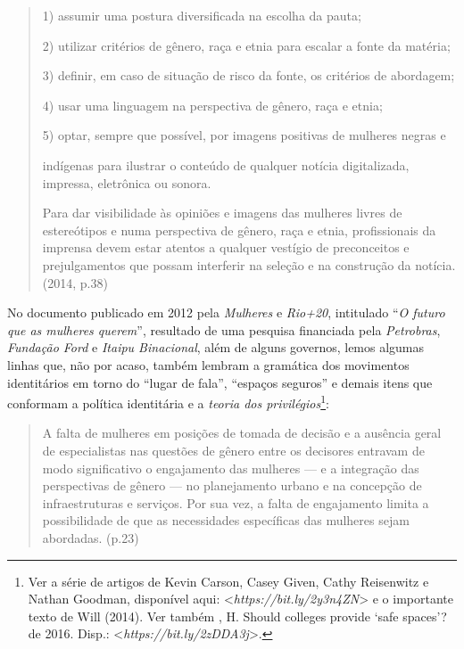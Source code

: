 \begin{quote}
1) assumir uma postura diversificada na escolha da pauta;

2) utilizar critérios de gênero, raça e etnia para escalar a fonte da
matéria;

3) definir, em caso de situação de risco da fonte, os critérios de
abordagem;

4) usar uma linguagem na perspectiva de gênero, raça e etnia;

5) optar, sempre que possível, por imagens positivas de mulheres negras
e

indígenas para ilustrar o conteúdo de qualquer notícia digitalizada,
impressa, eletrônica ou sonora.

Para dar visibilidade às opiniões e imagens das mulheres livres de
estereótipos e numa perspectiva de gênero, raça e etnia, profissionais
da imprensa devem estar atentos a qualquer vestígio de preconceitos e
prejulgamentos que possam interferir na seleção e na construção da
notícia. (2014, p.38)
\end{quote}

No documento publicado em 2012 pela \emph{ Mulheres} e \emph{Rio+20},
intitulado ``\emph{O futuro que as mulheres querem}'', resultado de uma
pesquisa financiada pela \emph{Petrobras}, \emph{Fundação Ford} e
\emph{Itaipu Binacional}, além de alguns governos, lemos algumas linhas
que, não por acaso, também lembram a gramática dos movimentos
identitários em torno do ``lugar de fala'', ``espaços seguros'' e demais
itens que conformam a política identitária e a \emph{teoria dos
privilégios}\footnote{Ver a série de artigos de Kevin Carson, Casey
  Given, Cathy Reisenwitz e Nathan Goodman, disponível aqui:
  \textless{}\emph{https://bit.ly/2y3n4ZN}\textgreater{} e o
  importante texto de Will (2014). Ver também , H. Should
  colleges provide `safe spaces'? de 2016. Disp.:
  \textless{}\emph{https://bit.ly/2zDDA3j}\textgreater{}.}:

\begin{quote}
A falta de mulheres em posições de tomada de decisão e a ausência geral
de especialistas nas questões de gênero entre os decisores entravam de
modo significativo o engajamento das mulheres --- e a integração das
perspectivas de gênero --- no planejamento urbano e na concepção de
infraestruturas e serviços. Por sua vez, a falta de engajamento limita a
possibilidade de que as necessidades específicas das mulheres sejam
abordadas. (p.23)
\end{quote}

